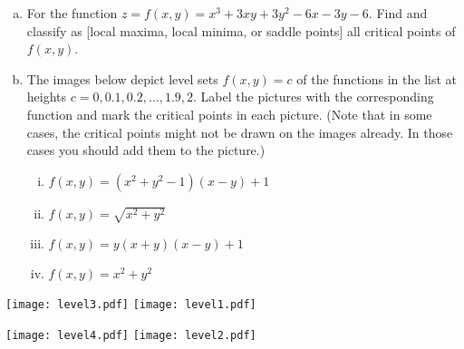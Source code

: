 \begin{question}[M200 2010A] %
\begin{enumerate}[(a)]
\item
For the function $z = f (x, y) = x^3 + 3xy + 3y^2 - 6x - 3y - 6$.
Find and classify as [local maxima, local minima, or saddle points] all critical points of
$f(x, y)$.
\item
The images below depict level sets $f (x, y) = c$ of the functions in the list at heights
$c = 0, 0.1, 0.2, \ldots , 1.9, 2$.
Label the pictures with the corresponding function and mark the critical points in each
picture. (Note that in some cases, the critical points might not be drawn on the images
already. In those cases you should add them to the picture.)
\begin{enumerate}[(i)]
\item
$f(x, y) = (x^2 + y^2 - 1)(x - y) + 1$
\item
$f(x, y) = \sqrt{x^2 + y^2}$
\item
$f(x, y) = y(x + y)(x - y) + 1$
\item
$f(x, y) = x^2 + y^2$
\end{enumerate}

\end{enumerate}

\begin{center}
  \texttt{[image: level3.pdf]}
\quad
  \texttt{[image: level1.pdf]}
\end{center}
\begin{center}
  \texttt{[image: level4.pdf]}
\quad
  \texttt{[image: level2.pdf]}
\end{center}
\end{question}

%

